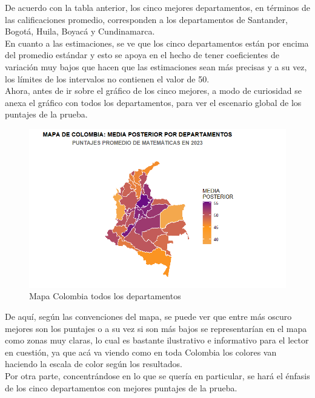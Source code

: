 \documentclass[12pt]{article}
\begin{document}
De acuerdo con la tabla anterior, los cinco mejores departamentos, en términos de las calificaciones promedio, corresponden a los departamentos de Santander, Bogotá, Huila, Boyacá y Cundinamarca.\\

En cuanto a las estimaciones, se ve que los cinco departamentos están por encima del promedio estándar y esto se apoya en el hecho de tener coeficientes de variación muy bajos que hacen que las estimaciones sean más precisas y a su vez, los límites de los intervalos no contienen el valor de 50.\\ 

Ahora, antes de ir sobre el gráfico de los cinco mejores, a modo de curiosidad se anexa el gráfico con todos los departamentos, para ver el escenario global de los puntajes de la prueba. 

\begin{figure}[H]
    \centering
    \includegraphics[width=1\linewidth]{Imagenes/MapaColombia1.png}
    \caption{Mapa Colombia todos los departamentos}
    \label{fig_enter_label}
\end{figure}

De aquí, según las convenciones del mapa, se puede ver que entre más oscuro mejores son los puntajes o a su vez si son más bajos se representarían en el mapa como zonas muy claras, lo cual es bastante ilustrativo e informativo para el lector en cuestión, ya que acá va viendo como en toda Colombia los colores van haciendo la escala de color según los resultados.\\

Por otra parte, concentrándose en lo que se quería en particular, se hará el énfasis de los cinco departamentos con mejores puntajes de la prueba.
\end{document}

